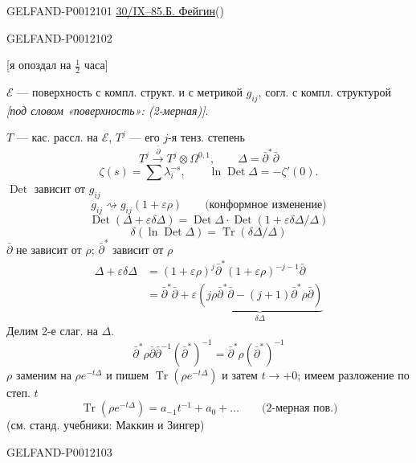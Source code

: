 \begin{GelfandAdjacentEvidence}{GELFAND-P001210}{1}
\underline{30/IX--85.}\qquad\underline{Б. Фейгин}\quad()

\end{GelfandAdjacentEvidence}
\begin{GelfandAdjacentEvidence}{GELFAND-P001210}{2}



[я опоздал на \(\frac12\) часа]


\(\mathcal E\) --- поверхность с компл. структ. и с метрикой \(g_{ij}\), согл. с компл. структурой
\textit{[под словом «поверхность»: (2-мерная)]}.

\(T\) --- кас. рассл. на \(\mathcal E\), \(T^j\) --- его \(j\)-я тенз. степень
\[
T^j\overset{\bar\partial}{\longrightarrow}T^j\otimes\Omega^{0,1},
\qquad \Delta=\bar\partial^*\bar\partial
\]
\[
\zeta(s)=\sum\lambda_i^{-s},\qquad
\ln\operatorname{Det}\Delta=-\zeta'(0).
\]
\(\operatorname{Det}\) зависит от \(g_{ij}\)
\[
g_{ij}\rightsquigarrow g_{ij}(1+\varepsilon\rho)
\qquad\text{(конформное изменение)}
\]
\[
\operatorname{Det}(\Delta+\varepsilon\delta\Delta)
=\operatorname{Det}\Delta\cdot
\operatorname{Det}\left(1+\varepsilon\delta\Delta/\Delta\right)
\]
\[
\delta(\ln\operatorname{Det}\Delta)=\operatorname{Tr}(\delta\Delta/\Delta)
\]
\(\bar\partial\) не зависит от \(\rho\); \(\bar\partial^*\) зависит от \(\rho\)
\[
\begin{aligned}
\Delta+\varepsilon\delta\Delta
&=(1+\varepsilon\rho)^j\bar\partial^*(1+\varepsilon\rho)^{-j-1}\bar\partial\\
&=\bar\partial^*\bar\partial+
\varepsilon\underbrace{\left(j\rho\bar\partial^*\bar\partial
-(j+1)\bar\partial^*\rho\bar\partial\right)}_{\delta\Delta}
\end{aligned}
\]
Делим 2-е слаг. на \(\Delta\).
\[
\bar\partial^*\rho\bar\partial\bar\partial^{-1}(\bar\partial^*)^{-1}
=\bar\partial^*\rho(\bar\partial^*)^{-1}
\]
\(\rho\) заменим на \(\rho e^{-t\Delta}\) и пишем
\(\operatorname{Tr}(\rho e^{-t\Delta})\) и затем \(t\to+0\);
имеем разложение по степ. \(t\)
\[
\operatorname{Tr}(\rho e^{-t\Delta})=a_{-1}t^{-1}+a_0+\ldots
\qquad\text{(2-мерная пов.)}
\]
(см. станд. учебники: Маккин и Зингер)
\end{GelfandAdjacentEvidence}
\begin{GelfandAdjacentEvidence}{GELFAND-P001210}{3}

\end{GelfandAdjacentEvidence}


